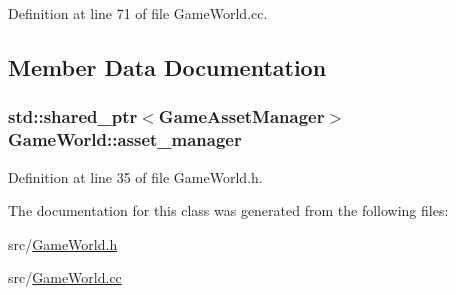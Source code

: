 Definition at line 71 of file Game\+World.\+cc.



\subsection{Member Data Documentation}
\hypertarget{class_game_world_aec5c0bca4fb5a41e4aac2dce2871266d}{}
\subsubsection[{asset\+\_\+manager}]{\setlength{\rightskip}{0pt plus 5cm}std\+::shared\+\_\+ptr$<${\bf Game\+Asset\+Manager}$>$ Game\+World\+::asset\+\_\+manager\hspace{0.3cm}{\ttfamily [private]}}\label{class_game_world_aec5c0bca4fb5a41e4aac2dce2871266d}


Definition at line 35 of file Game\+World.\+h.



The documentation for this class was generated from the following files\+:\begin{DoxyCompactItemize}
\item 
src/\hyperlink{_game_world_8h}{Game\+World.\+h}\item 
src/\hyperlink{_game_world_8cc}{Game\+World.\+cc}\end{DoxyCompactItemize}

